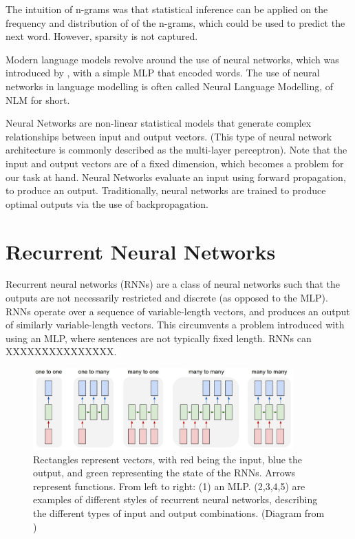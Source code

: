 \documentclass[12pt,twoside]{report}
\begin{document}
The intuition of n-grams was that statistical inference can be applied on the frequency and distribution of of the n-grams, which could be used to predict the next word. However, sparsity is not captured.

Modern language models revolve around the use of neural networks, which was introduced by \cite{bengio_neural_2001}, with a simple MLP that encoded words. The use of neural networks in language modelling is often called Neural Language Modelling, of NLM for short.

Neural Networks are non-linear statistical models that generate complex relationships between input and output vectors. (This type of neural network architecture is commonly described as the multi-layer perceptron). Note that the input and output vectors are of a fixed dimension, which becomes a problem for our task at hand. Neural Networks evaluate an input using forward propagation, to produce an output. Traditionally, neural networks are trained to produce optimal outputs via the use of backpropagation. 


\section{Recurrent Neural Networks}

Recurrent neural networks (RNNs) are a class of neural networks such that the outputs are not necessarily restricted and discrete (as opposed to the MLP). RNNs operate over a sequence of variable-length vectors, and produces an output of similarly variable-length vectors. This circumvents a problem introduced with using an MLP, where sentences are not typically fixed length. RNNs can XXXXXXXXXXXXXXX.


\begin{figure}[!ht]
      
	\centering
	\includegraphics[width=100mm]{diagrams/rnn.jpeg}
	\caption{Rectangles represent vectors, with red being the input, blue the output, and green representing the state of the RNNs. Arrows represent  functions. From left to right: (1) an MLP. (2,3,4,5) are examples of different styles of recurrent neural networks, describing the different types of input and output combinations. (Diagram from \cite{karpathy_unreasonable_2015}) \label{rnn}} 
  \end{figure}
  
\end{document}
